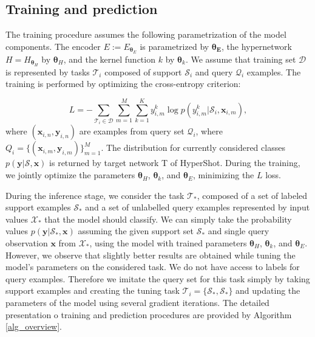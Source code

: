 \documentclass[nohyperref]{article}
\def\our{HyperShot}
\theoremstyle{plain}
\theoremstyle{definition}
\theoremstyle{remark}
\begin{document}
\subsection{Training and prediction}

The training procedure assumes the following parametrization of the model components. The encoder $E:=E_{\boldsymbol{\theta}_E}$ is parametrized by $\boldsymbol{\theta_E}$, the hypernetwork $H=H_{\boldsymbol{\theta}_H}$ by $\boldsymbol{\theta}_H$, and the kernel function $k$ by $\boldsymbol{\theta}_k$. We assume that training set $\mathcal{D}$ is represented by tasks $\mathcal{T}_i$ composed of support $\mathcal{S}_i$ and query $\mathcal{Q}_i$ examples. The training is performed by optimizing the cross-entropy criterion:

\begin{equation}
L = - \sum_{\mathcal{T}_i \in \mathcal{D}} \sum_{m=1}^M \sum_{k=1}^K y_{i, m}^k \log p(y_{i, m}^k|\mathcal{S}_i, \mathbf{x}_{i, m}),    
\end{equation}
where $(\mathbf{x}_{i,n}, \mathbf{y}_{i, n})$ are examples from query set $\mathcal{Q}_i$, where $Q_i=\{(\mathbf{x}_{i,m}, \mathbf{y}_{i, m})\}_{m=1}^M$. The distribution for currently considered classes $p(\mathbf{y}|\mathcal{S}, \mathbf{x})$ is returned by target network T of \our{}. During the training, we jointly optimize the parameters $\boldsymbol{\theta}_H$, $\boldsymbol{\theta}_k$,  and $\boldsymbol{\theta}_E$, minimizing the $L$ loss.  

During the inference stage, we consider the task $\mathcal{T}_*$, composed of a set of labeled support examples $\mathcal{S}_*$ and a set of unlabelled query examples represented by input values $\mathcal{X}_*$ that the model should classify. We can simply take the probability values $p(\mathbf{y}|\mathcal{S}_*, \mathbf{x})$ assuming the given support set $\mathcal{S}_*$ and single query observation $\mathbf{x}$ from $\mathcal{X}_*$, using the model with trained parameters $\boldsymbol{\theta}_H$, $\boldsymbol{\theta}_k$,  and $\boldsymbol{\theta}_E$. However, we observe that slightly better results are obtained while tuning the model's parameters on the considered task. We do not have access to  labels for query examples. Therefore we imitate the query set for this task simply by taking support examples and creating the tuning task $\mathcal{T}_i=\{\mathcal{S}_*,\mathcal{S}_*\}$ and updating the parameters of the model using several gradient iterations. The detailed presentation o training and prediction procedures are provided by Algorithm \ref{alg_overview}. 
\end{document}
